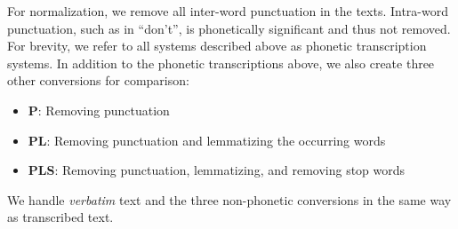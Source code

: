 For normalization, we remove all inter-word punctuation in the texts.
Intra-word punctuation, such as in ``don't'', is phonetically significant and thus not removed.
For brevity, we refer to all systems described above as phonetic transcription systems.
In addition to the phonetic transcriptions above, we also create three other conversions for comparison:
\begin{itemize}
  \item \textbf{P}: Removing punctuation
  \item \textbf{PL}: Removing punctuation and lemmatizing the occurring words
  \item \textbf{PLS}: Removing punctuation, lemmatizing, and removing stop words
\end{itemize}
We handle \textit{verbatim} text and the three non-phonetic conversions in the same way as transcribed text.